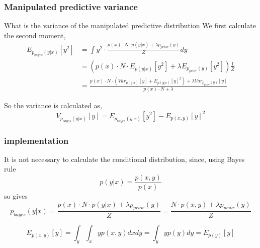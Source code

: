 \subsubsection{Manipulated predictive variance}
What is the variance of the manipulated predictive distribution
We first calculate the second moment, 
\begin{align*}
    E_{p_{bayes}(y|x)}[y^2] &= \int y^2 \cdot \frac{p(x)\cdot N \cdot p(y|x) + \lambda p_{prior}(y)}{Z} dy\\
    &= (p(x)\cdot N\cdot E_{p(y|x)}[y^2] + \lambda E_{p_{prior}(y)}[y^2] ) \frac{1}{Z}\\
    &= \frac{p(x)\cdot N \cdot(Var_{p(y|x)}[y]+E_{p(y|x)}[y]^2) + \lambda Var_{p_{prior}(y)}[y]}{p(x)\cdot N+\lambda}
\end{align*}

So the variance is calculated as, 
$$V_{p_{bayes}(y|x)}[y] = E_{p_{bayes}(y|x)}[y^2] - E_{p(x,y)}[y]^2$$

\subsubsection*{implementation}
It is not necessary to calculate the conditional distribution, since, using Bayes rule
$$p(y|x) = \frac{p(x,y)}{p(x)}$$
so gives
$$p_{bayes}(y|x) = \frac{p(x)\cdot N \cdot p(y|x) + \lambda p_{prior}(y)}{Z} = \frac{N \cdot p(x,y) + \lambda p_{prior}(y)}{Z}$$

$$E_{p(x,y)}[y] = \int_y \int_x yp(x,y) dx dy = \int_y y p(y) dy = E_{p(y)}[y]$$